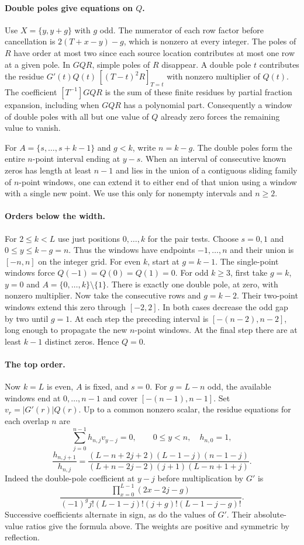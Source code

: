 \documentclass[11pt]{article}
\begin{document}
\paragraph{Double poles give equations on $Q$.}
Use $X=\{y,y+g\}$ with $g$ odd. The numerator of each row factor before
cancellation is $2(T+x-y)-g$, which is nonzero at every integer.
The poles of $R$ have order at most two since each source location
contributes at most one row at a given pole. In $GQR$, simple poles of
$R$ disappear. A double pole $t$ contributes the residue
$G'(t)Q(t)\,[ (T-t)^2R ]_{T=t}$ with nonzero multiplier of $Q(t)$.
The coefficient $[T^{-1}]GQR$ is the sum of these finite residues by
partial fraction expansion, including when $GQR$ has a polynomial part.
Consequently a window of double poles with all but one value of $Q$
already zero forces the remaining value to vanish.

For $A=\{s,\ldots,s+k-1\}$ and $g<k$, write $n=k-g$.
The double poles form the entire $n$-point interval ending at $y-s$.
When an interval of consecutive known zeros has length at least $n-1$
and lies in the union of a contiguous sliding family of $n$-point windows,
one can extend it to either end of that union using a window with a
single new point. We use this only for nonempty intervals and $n\ge2$.

\paragraph{Orders below the width.}
For $2\le k<L$ use just positions $0,\ldots,k$ for the pair tests.
Choose $s=0,1$ and $0\le y\le k-g=n$. Thus the windows have endpoints
$-1,\ldots,n$ and their union is $[-n,n]$ on the integer grid.
For even $k$, start at $g=k-1$. The single-point windows force
$Q(-1)=Q(0)=Q(1)=0$. For odd $k\ge3$, first take $g=k$, $y=0$ and
$A=\{0,\ldots,k\}\setminus\{1\}$. There is exactly one double pole,
at zero, with nonzero multiplier. Now take the consecutive rows and
$g=k-2$. Their two-point windows extend this zero through $[-2,2]$.
In both cases decrease the odd gap by two until $g=1$.
At each step the preceding interval is $[-(n-2),n-2]$, long enough
to propagate the new $n$-point windows. At the final step there are
at least $k-1$ distinct zeros. Hence $Q=0$.

\paragraph{The top order.}
Now $k=L$ is even, $A$ is fixed, and $s=0$. For $g=L-n$ odd, the
available windows end at $0,\ldots,n-1$ and cover $[-(n-1),n-1]$.
Set $v_r=|G'(r)|Q(r)$. Up to a common nonzero scalar, the residue
equations for each overlap $n$ are
\[
 \sum_{j=0}^{n-1} h_{n,j} v_{y-j}=0,\qquad 0\le y<n ,
 \quad h_{n,0}=1 ,
\]
\[
 \frac{h_{n,j+1}}{h_{n,j}}
 =\frac{(L-n+2j+2)(L-1-j)(n-1-j)}
 {(L+n-2j-2)(j+1)(L-n+1+j)} .
\]
Indeed the double-pole coefficient at $y-j$ before multiplication
by $G'$ is
\[
 \frac{\prod_{x=0}^{L-1}(2x-2j-g)}
 {(-1)^g j!(L-1-j)!(j+g)!(L-1-j-g)!}.
\]
Successive coefficients alternate in sign, as do the values of $G'$.
Their absolute-value ratios give the formula above. The weights are
positive and symmetric by reflection.
\end{document}
